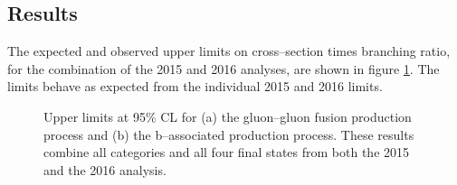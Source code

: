 \subsection{Results}
\label{sec:mssm_combination_results}
The expected and observed upper limits on cross--section times branching ratio,
for the combination of the 2015 and 2016 analyses, are shown in figure
\ref{fig:mssm_results_combination_limits}. The limits behave as expected
from the individual 2015 and 2016 limits. 

\begin{figure}[h!]
\begin{center}
\end{center}
\caption{Upper limits at 95\% CL for (a) the gluon--gluon fusion production
process and (b) the b--associated production process. These results
combine all categories and all four final states from both the 2015
and the 2016 analysis.}
\label{fig:mssm_results_combination_limits}
\end{figure}


